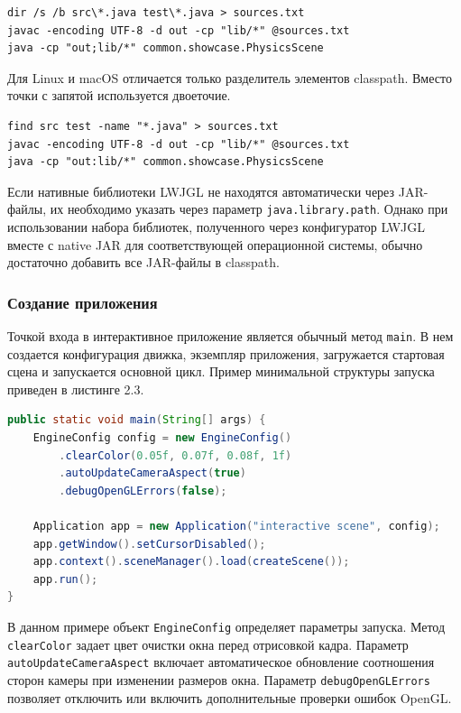 \begin{lstlisting}[caption={Пример ручной компиляции проекта в Windows}]
dir /s /b src\*.java test\*.java > sources.txt
javac -encoding UTF-8 -d out -cp "lib/*" @sources.txt
java -cp "out;lib/*" common.showcase.PhysicsScene
\end{lstlisting}

Для Linux и macOS отличается только разделитель элементов classpath. Вместо точки с запятой используется двоеточие.

\begin{lstlisting}[caption={Пример ручной компиляции проекта в Linux и macOS}]
find src test -name "*.java" > sources.txt
javac -encoding UTF-8 -d out -cp "lib/*" @sources.txt
java -cp "out:lib/*" common.showcase.PhysicsScene
\end{lstlisting}

Если нативные библиотеки LWJGL не находятся автоматически через JAR-файлы, их необходимо указать через параметр \texttt{java.library.path}. Однако при использовании набора библиотек, полученного через конфигуратор LWJGL вместе с native JAR для соответствующей операционной системы, обычно достаточно добавить все JAR-файлы в classpath.

\subsubsection{Создание приложения}

Точкой входа в интерактивное приложение является обычный метод \texttt{main}. В нем создается конфигурация движка, экземпляр приложения, загружается стартовая сцена и запускается основной цикл. Пример минимальной структуры запуска приведен в листинге 2.3.

\begin{lstlisting}[language=Java,caption={Создание приложения и запуск сцены}]
public static void main(String[] args) {
    EngineConfig config = new EngineConfig()
        .clearColor(0.05f, 0.07f, 0.08f, 1f)
        .autoUpdateCameraAspect(true)
        .debugOpenGLErrors(false);

    Application app = new Application("interactive scene", config);
    app.getWindow().setCursorDisabled();
    app.context().sceneManager().load(createScene());
    app.run();
}
\end{lstlisting}

В данном примере объект \texttt{EngineConfig} определяет параметры запуска. Метод \texttt{clearColor} задает цвет очистки окна перед отрисовкой кадра. Параметр \texttt{autoUpdateCameraAspect} включает автоматическое обновление соотношения сторон камеры при изменении размеров окна. Параметр \texttt{debugOpenGLErrors} позволяет отключить или включить дополнительные проверки ошибок OpenGL.

